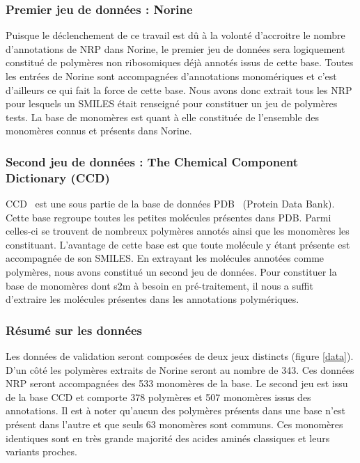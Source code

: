 \subsubsection{Premier jeu de données : Norine}

Puisque le déclenchement de ce travail est dû à la volonté d'accroitre le nombre d'annotations de NRP dans Norine, le premier jeu de données sera logiquement constitué de polymères non ribosomiques déjà annotés issus de cette base.
Toutes les entrées de Norine sont accompagnées d'annotations monomériques et c'est d'ailleurs ce qui fait la force de cette base.
Nous avons donc extrait tous les NRP pour lesquels un SMILES était renseigné pour constituer un jeu de polymères tests.
La base de monomères est quant à elle constituée de l'ensemble des monomères connus et présents dans Norine.


\subsubsection{Second jeu de données : The Chemical Component Dictionary (CCD)}

CCD~\cite{westbrook_chemical_2015} est une sous partie de la base de données PDB~\cite{berman_protein_2000} (Protein Data Bank).
Cette base regroupe toutes les petites molécules présentes dans PDB.
Parmi celles-ci se trouvent de nombreux polymères annotés ainsi que les monomères les constituant.
L'avantage de cette base est que toute molécule y étant présente est accompagnée de son SMILES.
En extrayant les molécules annotées comme polymères, nous avons constitué un second jeu de données.
Pour constituer la base de monomères dont s2m à besoin en pré-traitement, il nous a suffit d'extraire les molécules présentes dans les annotations polymériques.


\subsubsection{Résumé sur les données}

Les données de validation seront composées de deux jeux distincts (figure \ref{data}).
D'un côté les polymères extraits de Norine seront au nombre de 343.
Ces données NRP seront accompagnées des 533 monomères de la base.
Le second jeu est issu de la base CCD et comporte 378 polymères et 507 monomères issus des annotations.
Il est à noter qu'aucun des polymères présents dans une base n'est présent dans l'autre et que seuls 63 monomères sont communs.
Ces monomères identiques sont en très grande majorité des acides aminés classiques et leurs variants proches.

